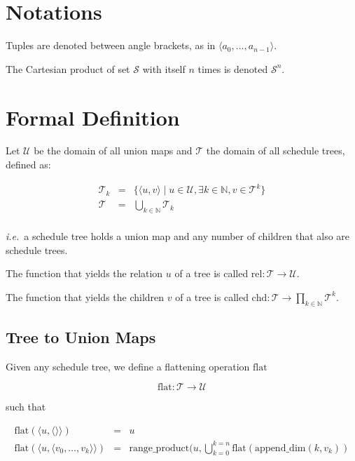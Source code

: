 \documentclass{article}
\begin{document}
\section*{Notations}

Tuples are denoted between angle brackets, as in $\langle a_0, \ldots,
a_{n-1}\rangle$.

The Cartesian product of set $\mathcal{S}$ with itself $n$ times is denoted
$\mathcal{S}^n$.

\section{Formal Definition}


Let $\mathcal{U}$ be the domain of all union maps and $\mathcal{T}$ the domain
of all schedule trees, defined as:

\[
    \begin{array}{lcl}
        \mathcal{T}_k &=& \{ \langle u, v\rangle \mid u \in \mathcal{U}, \exists k\in\mathbb{N}, v \in \mathcal{T}^k \} \\
        \mathcal{T} &=& \displaystyle\bigcup_{k\in\mathbb{N}} \mathcal{T}_k\\
    \end{array}
\]

\noindent \emph{i.e.}\ a schedule tree holds a union map and any number of children that also are schedule trees.

The function that yields the relation $u$ of a tree is called $\mathrm{rel}:\mathcal{T} \rightarrow \mathcal{U}$.

The function that yields the children $v$ of a tree is called $\mathrm{chd}:\mathcal{T} \rightarrow \displaystyle\prod_{k\in\mathbb{N}}\mathcal{T}^k$.

\subsection{Tree to Union Maps}

Given any schedule tree, we define a flattening operation $\mathrm{flat}$

\[
    \mathrm{flat}: \mathcal{T} \rightarrow \mathcal{U}
\]

\noindent such that

\[
    \begin{array}{lcl}
        \mathrm{flat}(\langle u, \langle\rangle \rangle) &=& u \\
        \mathrm{flat}(\langle u, \langle v_0, \ldots, v_k\rangle \rangle) &=& \mathrm{range\_product}(u, \bigcup_{k=0}^{k=n} \mathrm{flat}(\mathrm{append\_dim}(k, v_k)) \\
    \end{array}
\]
\end{document}

